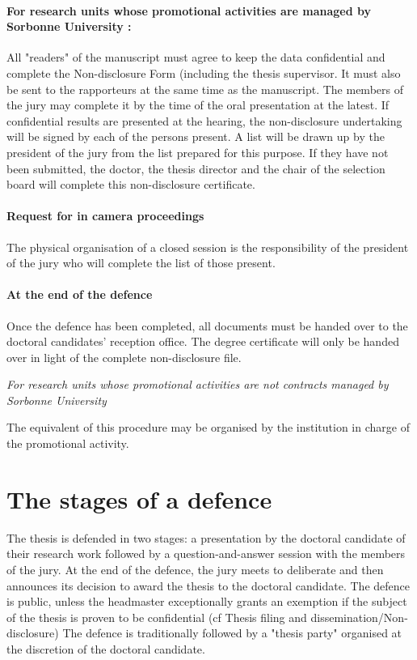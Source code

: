 \paragraph{For research units whose promotional activities are managed by Sorbonne University :}
All "readers" of the manuscript must agree to keep the data confidential and complete the Non-disclosure Form (including the thesis supervisor. It must also be sent to the rapporteurs at the same time as the manuscript.
The members of the jury may complete it by the time of the oral presentation at the latest.
If confidential results are presented at the hearing, the non-disclosure undertaking will be signed by each of the persons present. A list will be drawn up by the president of the jury from the list prepared for this purpose. 
If they have not been submitted, the doctor, the thesis director and the chair of the selection board will complete this non-disclosure certificate. 

\paragraph{Request for in camera proceedings}
The physical organisation of a closed session is the responsibility of the president of the jury who will complete the list of those present.

\paragraph{At the end of the defence}
Once the defence has been completed, all documents must be handed over to the doctoral candidates' reception office. The degree certificate will only be handed over in light of the complete non-disclosure file.

\emph{For research units whose promotional activities are not contracts managed by Sorbonne University}

The equivalent of this procedure may be organised by the institution in charge of the promotional activity.

\section{The stages of a defence}
\label{sec:stages-if-a-defence}

The thesis is defended in two stages: a presentation by the doctoral candidate of their research work followed by a question-and-answer session with the members of the jury. At the end of the defence, the jury meets to deliberate and then announces its decision to award the thesis to the doctoral candidate. 
The defence is public, unless the headmaster exceptionally grants an exemption if the subject of the thesis is proven to be confidential (cf Thesis filing and dissemination/Non-disclosure)
The defence is traditionally followed by a "thesis party" organised at the discretion of the doctoral candidate.

